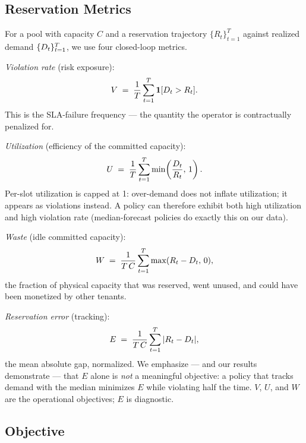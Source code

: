 \subsection{Reservation Metrics}

For a pool with capacity $C$ and a reservation trajectory
$\{R_t\}_{t=1}^{T}$ against realized demand $\{D_t\}_{t=1}^{T}$,
we use four closed-loop metrics.

\emph{Violation rate} (risk exposure):
\begin{equation}
V \;=\; \frac{1}{T}\sum_{t=1}^{T} \mathbf{1}[D_t > R_t].
\label{eq:violation}
\end{equation}
This is the SLA-failure frequency --- the quantity the operator is
contractually penalized for.

\emph{Utilization} (efficiency of the committed capacity):
\begin{equation}
U \;=\; \frac{1}{T}\sum_{t=1}^{T} \min\!\left(\frac{D_t}{R_t},\,1\right).
\label{eq:utilization}
\end{equation}
Per-slot utilization is capped at 1: over-demand does not inflate
utilization; it appears as violations instead. A policy can therefore
exhibit both high utilization and high violation rate
(median-forecast policies do exactly this on our data).

\emph{Waste} (idle committed capacity):
\begin{equation}
W \;=\; \frac{1}{T\,C}\sum_{t=1}^{T} \max(R_t - D_t,\, 0),
\label{eq:waste}
\end{equation}
the fraction of physical capacity that was reserved, went unused, and
could have been monetized by other tenants.

\emph{Reservation error} (tracking):
\begin{equation}
E \;=\; \frac{1}{T\,C}\sum_{t=1}^{T} |R_t - D_t|,
\label{eq:reserr}
\end{equation}
the mean absolute gap, normalized. We emphasize --- and our results
demonstrate --- that $E$ alone is \emph{not} a meaningful objective:
a policy that tracks demand with the median minimizes $E$ while
violating half the time. $V$, $U$, and $W$ are the operational
objectives; $E$ is diagnostic.

\subsection{Objective}

